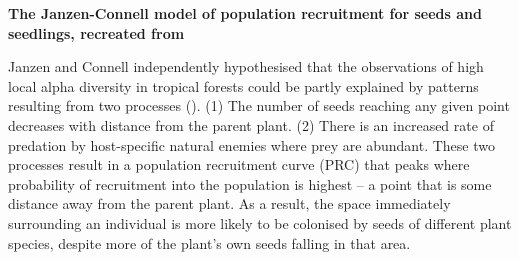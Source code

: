 \documentclass[12pt,a4]{RDGThesis}
\begin{document}
\begin{framed} \singlespacing
\textbf{The Janzen-Connell model of population recruitment for seeds and seedlings, recreated from \cite{janzenHerbivoresNumberTree1970}}

\begin{figure}
\end{figure}
\small{Janzen and Connell independently hypothesised that the observations of high local alpha diversity in tropical forests could be partly explained by patterns resulting from two processes (\cite{connellRoleNaturalEnemies1971, janzenHerbivoresNumberTree1970}). (1) The number of seeds reaching any given point decreases with distance from the parent plant. (2) There is an increased rate of predation by host-specific natural enemies where prey are abundant. These two processes result in a population recruitment curve (PRC) that peaks where probability of recruitment into the population is highest – a point that is some distance away from the parent plant. As a result, the space immediately surrounding an individual is more likely to be colonised by seeds of different plant species, despite more of the plant’s own seeds falling in that area. 

}
\end{framed}
\end{document}
